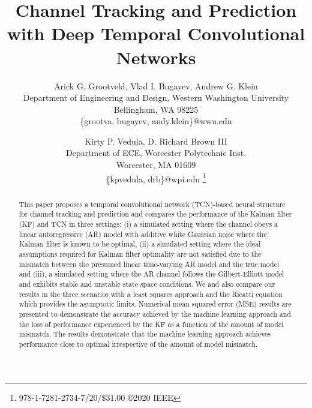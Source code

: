 \documentclass[twocolumn,letterpaper]{IEEEAerospaceCLS}  %
\begin{document}
\title{Channel Tracking and Prediction with Deep Temporal Convolutional Networks}

\author{%
Arick G. Grootveld, Vlad I. Bugayev, Andrew G. Klein\\
Department of Engineering and Design, Western Washington University\\
Bellingham, WA 98225\\
\{grootva, bugayev, andy.klein\}@wwu.edu
\and
Kirty P. Vedula, D. Richard Brown III\\
Department of ECE, Worcester Polytechnic Inst.\\
Worcester, MA 01609\\
\{kpvedula, drb\}@wpi.edu
\thanks{\footnotesize 978-1-7281-2734-7/20/$\$31.00$ \copyright2020 IEEE}              %
}


\maketitle

\thispagestyle{plain}
\pagestyle{plain}




\begin{abstract}

This paper proposes a temporal convolutional network (TCN)-based neural structure for channel tracking and prediction and compares the performance of the Kalman filter (KF) and TCN in three settings: (i) a simulated setting where the channel obeys a linear autoregressive (AR) model with additive white Gaussian noise where the Kalman filter is known to be optimal, (ii) a simulated setting where the ideal assumptions required for Kalman filter optimality are not satisfied due to the mismatch between the presumed linear time-varying AR model and the true model and (iii), a simulated setting where the AR channel follows the Gilbert-Elliott model and exhibits stable and unstable state space conditions. We and also  compare  our  results in the three  scenarios  with  a  least  squares  approach  and  the Ricatti equation which provides the asymptotic limits. Numerical mean squared error (MSE) results are presented to demonstrate the accuracy achieved by the machine learning approach and the loss of performance experienced by the KF as a function of the amount of model mismatch. The results demonstrate that the machine learning approach achieves performance close to optimal irrespective of the amount of model mismatch.

\end{abstract}
\end{document}
